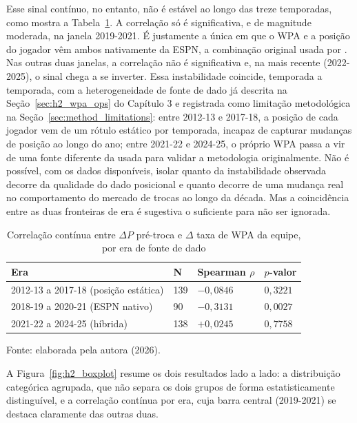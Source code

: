 Esse sinal contínuo, no entanto, não é estável ao longo das treze temporadas, como mostra a Tabela~\ref{tab:h2_eras}. A correlação só é significativa, e de magnitude moderada, na janela 2019-2021. É justamente a única em que o WPA e a posição do jogador vêm ambos nativamente da ESPN, a combinação original usada por \citet{sa2025}. Nas outras duas janelas, a correlação não é significativa e, na mais recente (2022-2025), o sinal chega a se inverter. Essa instabilidade coincide, temporada a temporada, com a heterogeneidade de fonte de dado já descrita na Seção~\ref{sec:h2_wpa_ops} do Capítulo 3 e registrada como limitação metodológica na Seção~\ref{sec:method_limitations}: entre 2012-13 e 2017-18, a posição de cada jogador vem de um rótulo estático por temporada, incapaz de capturar mudanças de posição ao longo do ano; entre 2021-22 e 2024-25, o próprio WPA passa a vir de uma fonte diferente da usada para validar a metodologia originalmente. Não é possível, com os dados disponíveis, isolar quanto da instabilidade observada decorre da qualidade do dado posicional e quanto decorre de uma mudança real no comportamento do mercado de trocas ao longo da década. Mas a coincidência entre as duas fronteiras de era é sugestiva o suficiente para não ser ignorada.

\begin{table}[htb]
    \centering
    \caption{Correlação contínua entre $\Delta P$ pré-troca e $\Delta$ taxa de WPA da equipe, por era de fonte de dado}
    \label{tab:h2_eras}
    \begin{tabular}{|p{4.4cm}|p{1.4cm}|p{2.0cm}|p{2.0cm}|}
    \hline
    \textbf{Era} & \textbf{N} & \textbf{Spearman $\rho$} & \textbf{$p$-valor} \\
    \hline
    2012-13 a 2017-18 (posição estática) & 139 & $-0{,}0846$ & $0{,}3221$ \\
    \hline
    2018-19 a 2020-21 (ESPN nativo) & 90 & $-0{,}3131$ & $0{,}0027$ \\
    \hline
    2021-22 a 2024-25 (híbrida) & 138 & $+0{,}0245$ & $0{,}7758$ \\
    \hline
    \end{tabular}
    \begin{flushleft}
    \footnotesize Fonte: elaborada pela autora (2026).
    \end{flushleft}
\end{table}

A Figura~\ref{fig:h2_boxplot} resume os dois resultados lado a lado: a distribuição categórica agrupada, que não separa os dois grupos de forma estatisticamente distinguível, e a correlação contínua por era, cuja barra central (2019-2021) se destaca claramente das outras duas.

